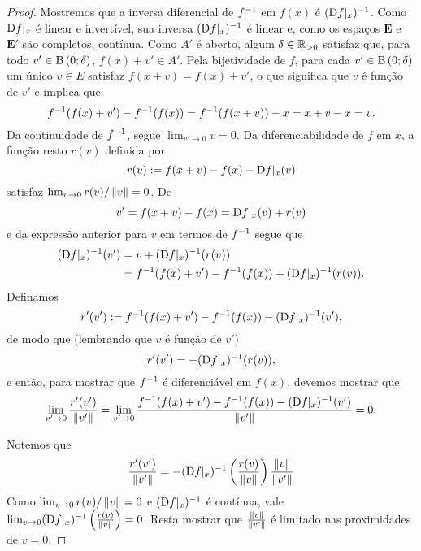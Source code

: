 \begin{proof}
Mostremos que a inversa diferencial de $f^{-1}$ em $f(x)$ é $(\mathrm{D} f|_x)^{-1}$. Como $\mathrm{D} f|_x$ é linear e invertível, sua inversa $(\mathrm{D} f|_x)^{-1}$ é linear e, como os espaços $\bm E$ e $\bm E'$ são completos, contínua. Como $A'$ é aberto, algum $\delta \in \mathbb{R}_{>0}$ satisfaz que, para todo $v' \in \mathrm{B}\left(0; \delta\right)$, $f(x)+v' \in A'$. Pela bijetividade de $f$, para cada $v' \in \mathrm{B}\left(0; \delta\right)$ um único $v \in E$ satisfaz $f(x+v) = f(x) + v'$, o que significa que $v$ é função de $v'$ e implica que
	\begin{equation*}
	f^{-1}(f(x) + v') - f^{-1}(f(x)) = f^{-1}(f(x+v)) - x = x + v - x = v.
	\end{equation*}
Da continuidade de $f^{-1}$, segue $\lim_{v' \to 0} v = 0$. Da diferenciabilidade de $f$ em $x$, a função resto $r(v)$ definida por
	\begin{equation*}
	r(v) := f(x+v) - f(x) - \mathrm{D} f|_x(v)
	\end{equation*}
satisfaz $\lim_{v \to 0} r(v)/\left\Vert{v}\right\Vert = 0$. De
	\begin{equation*}
	v' = f(x+v) - f(x) = \mathrm{D} f|_x(v) + r(v)
	\end{equation*}
e da expressão anterior para $v$ em termos de $f^{-1}$ segue que
	\begin{align*}
	(\mathrm{D} f|_x)^{-1} (v') &= v + (\mathrm{D} f|_x)^{-1}(r(v)) \\
		&= f^{-1}(f(x) + v') - f^{-1}(f(x)) + (\mathrm{D} f|_x)^{-1}(r(v)).
	\end{align*}
Definamos
	\begin{equation*}
	r'(v') := f^{-1}(f(x) + v') - f^{-1}(f(x)) - (\mathrm{D} f|_x)^{-1} (v'),
	\end{equation*}
de modo que (lembrando que $v$ é função de $v'$)
	\begin{equation*}
	r'(v') = -(\mathrm{D} f|_x)^{-1}(r(v)),
	\end{equation*}
e então, para mostrar que $f^{-1}$ é diferenciável em $f(x)$, devemos mostrar que
	\begin{equation*}
	\lim_{v' \to 0} \frac{r'(v')}{\left\Vert{v'}\right\Vert} = \lim_{v' \to 0} \frac{f^{-1}(f(x) + v') - f^{-1}(f(x)) - (\mathrm{D} f|_x)^{-1} (v')}{\left\Vert{v'}\right\Vert} = 0.
	\end{equation*}

Notemos que
	\begin{equation*}
	\frac{r'(v')}{\left\Vert{v'}\right\Vert} = - (\mathrm{D} f|_x)^{-1} \left( \frac{r(v)}{\left\Vert{v}\right\Vert} \right) \frac{\left\Vert{v}\right\Vert}{\left\Vert{v'}\right\Vert}
	\end{equation*}
Como $\lim_{v \to 0} r(v)/\left\Vert{v}\right\Vert = 0$ e $(\mathrm{D} f|_x)^{-1}$ é  contínua, vale $\lim_{v \to 0} (\mathrm{D} f|_x)^{-1} \left( \frac{r(v)}{\left\Vert{v}\right\Vert} \right) = 0$. Resta mostrar que $\frac{\left\Vert{v}\right\Vert}{\left\Vert{v'}\right\Vert}$ é limitado nas proximidades de $v=0$.


\end{proof}
